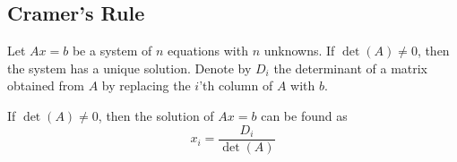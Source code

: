 \subsection{Cramer's Rule}\label{subsec-cramers-rule}

\begin{flushleft}
	Let $Ax=b$ be a system of $n$ equations with $n$ unknowns. If $\det(A)\neq0$,
	then the system has a unique solution. Denote by $D_i$ the determinant of a
	matrix obtained from $A$ by replacing the $i$'th column of $A$ with $b$.
\end{flushleft}

\begin{thm}\label{thm-cramers-rule}
	If $\det(A)\neq0$, then the solution of $Ax=b$ can be found as
	\begin{equation}
		x_i = \frac{D_i}{\det(A)}
	\end{equation}
\end{thm}

